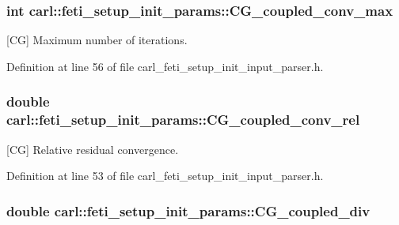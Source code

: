 \subsubsection[{C\+G\+\_\+coupled\+\_\+conv\+\_\+max}]{\setlength{\rightskip}{0pt plus 5cm}int carl\+::feti\+\_\+setup\+\_\+init\+\_\+params\+::\+C\+G\+\_\+coupled\+\_\+conv\+\_\+max}\label{structcarl_1_1feti__setup__init__params_ae4c09e7d30917128caaf61289134ea72}


\mbox{[}C\+G\mbox{]} Maximum number of iterations. 



Definition at line 56 of file carl\+\_\+feti\+\_\+setup\+\_\+init\+\_\+input\+\_\+parser.\+h.

\hypertarget{structcarl_1_1feti__setup__init__params_aae5ec90d93e9c86492d34dbba18a7dc7}{}
\subsubsection[{C\+G\+\_\+coupled\+\_\+conv\+\_\+rel}]{\setlength{\rightskip}{0pt plus 5cm}double carl\+::feti\+\_\+setup\+\_\+init\+\_\+params\+::\+C\+G\+\_\+coupled\+\_\+conv\+\_\+rel}\label{structcarl_1_1feti__setup__init__params_aae5ec90d93e9c86492d34dbba18a7dc7}


\mbox{[}C\+G\mbox{]} Relative residual convergence. 



Definition at line 53 of file carl\+\_\+feti\+\_\+setup\+\_\+init\+\_\+input\+\_\+parser.\+h.

\hypertarget{structcarl_1_1feti__setup__init__params_ae5f29857dc1428d3faf85eb7e67de7b2}{}
\subsubsection[{C\+G\+\_\+coupled\+\_\+div}]{\setlength{\rightskip}{0pt plus 5cm}double carl\+::feti\+\_\+setup\+\_\+init\+\_\+params\+::\+C\+G\+\_\+coupled\+\_\+div}\label{structcarl_1_1feti__setup__init__params_ae5f29857dc1428d3faf85eb7e67de7b2}


